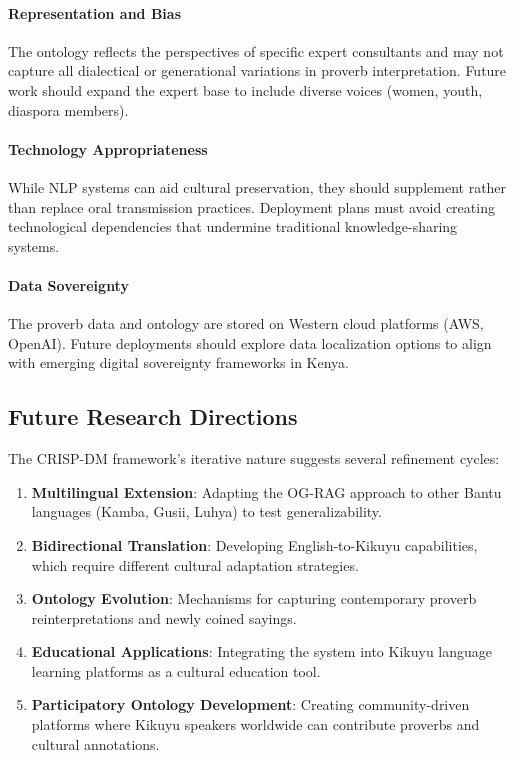 \paragraph{Representation and Bias} The ontology reflects the perspectives of specific expert consultants and may not capture all dialectical or generational variations in proverb interpretation. Future work should expand the expert base to include diverse voices (women, youth, diaspora members).

\paragraph{Technology Appropriateness} While NLP systems can aid cultural preservation, they should supplement rather than replace oral transmission practices. Deployment plans must avoid creating technological dependencies that undermine traditional knowledge-sharing systems.

\paragraph{Data Sovereignty} The proverb data and ontology are stored on Western cloud platforms (AWS, OpenAI). Future deployments should explore data localization options to align with emerging digital sovereignty frameworks in Kenya.

\subsection{Future Research Directions}
\label{subsec:future_directions}

The CRISP-DM framework's iterative nature suggests several refinement cycles:

\begin{enumerate}
    \item \textbf{Multilingual Extension}: Adapting the OG-RAG approach to other Bantu languages (Kamba, Gusii, Luhya) to test generalizability.
    
    \item \textbf{Bidirectional Translation}: Developing English-to-Kikuyu capabilities, which require different cultural adaptation strategies.
    
    \item \textbf{Ontology Evolution}: Mechanisms for capturing contemporary proverb reinterpretations and newly coined sayings.
    
    \item \textbf{Educational Applications}: Integrating the system into Kikuyu language learning platforms as a cultural education tool.
    
    \item \textbf{Participatory Ontology Development}: Creating community-driven platforms where Kikuyu speakers worldwide can contribute proverbs and cultural annotations.
\end{enumerate}

